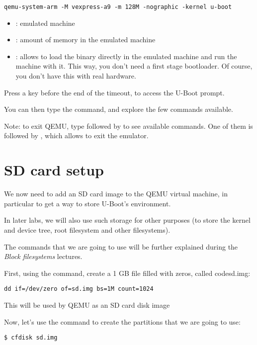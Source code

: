 \begin{verbatim}
qemu-system-arm -M vexpress-a9 -m 128M -nographic -kernel u-boot
\end{verbatim}

\begin{itemize}
\item {}: emulated machine
\item {}: amount of memory in the emulated machine
\item {}: allows to load the binary directly in the emulated
      machine and run the machine with it. This way, you don't
      need a first stage bootloader. Of course, you don't
      have this with real hardware.
\end{itemize}

Press a key before the end of the timeout, to access the U-Boot prompt.

You can then type the  command, and explore the few commands
available.

Note: to exit QEMU, type \code{[Ctrl][a]} followed by \code{[h]}
to see available commands. One of them is \code{[Ctrl][a]} followed by
\code{[x]}, which allows to exit the emulator.

\section{SD card setup}

We now need to add an SD card image to the QEMU virtual machine,
in particular to get a way to store U-Boot's environment.

In later labs, we will also use such storage for other purposes
(to store the kernel and device tree, root filesystem and other
filesystems).

The commands that we are going to use will be further explained
during the {\em Block filesystems} lectures.

First, using the  command, create a 1 GB file
filled with zeros, called code{sd.img}:

\begin{verbatim}
dd if=/dev/zero of=sd.img bs=1M count=1024
\end{verbatim}

This will be used by QEMU as an SD card disk image

Now, let's use the  command to create the partitions that
we are going to use:

\begin{verbatim}
$ cfdisk sd.img
\end{verbatim}

